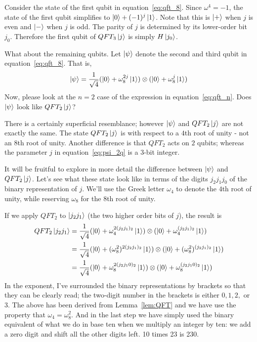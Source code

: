 Consider the state of the first qubit in equation~\eqref{eq:qft_8}. Since $\omega^4=-1$, the state of the first qubit simplifies to $\ket{0}+(-1)^j\ket{1}$. Note that this is $\ket{+}$ when $j$ is even and $\ket{-}$ when $j$ is odd. The parity of $j$ is determined by its lower-order bit $j_0$. Therefore the first qubit of $QFT_3\ket{j}$ is simply $H\ket{j_0}$.

What about the remaining qubits. Let $\ket{\psi}$ denote the second and third qubit in equation~\eqref{eq:qft_8}. That is,
\begin{equation}
\ket{\psi}=\frac{1}{\sqrt{4}}(\ket{0}+\omega_8^{2j}\ket{1})\otimes (\ket{0}+\omega_8^j\ket{1})
\label{eq:psi_2q}
\end{equation}
Now, please look at the $n=2$ case of the expression in equation~\eqref{eq:qft_n}. Does $\ket{\psi}$ look like $QFT_2\ket{j}$?

There is a certainly superficial resemblance; however $\ket{\psi}$ and $QFT_2\ket{j}$ are not exactly the same. The state $QFT_2\ket{j}$ is with respect to a $4$th root of unity - not an $8$th root of unity. Another difference is that $QFT_2$ acts on $2$ qubits; whereas the parameter $j$ in equation~\eqref{eq:psi_2q} is a $3$-bit integer.

It will be fruitful to explore in more detail the difference between $\ket{\psi}$ and $QFT_2\ket{j}$. Let's see what these state look like in terms of the digits $j_2j_1j_0$ of the binary representation of $j$. We'll use the Greek letter $\omega_4$ to denote the $4$th root of unity, while reserving $\omega_8$ for the $8$th root of unity.

If we apply $QFT_2$ to $\ket{j_2j_1}$ (the two higher order bits of $j$), the result is
\begin{align*}
    QFT_2\ket{j_2j_1} &=\frac{1}{\sqrt{4}}(\ket{0}+\omega_4^{2(j_2j_1)_2}\ket{1})\otimes(\ket{0}+\omega_4^{(j_2j_1)_2}\ket{1})\\
    &=\frac{1}{\sqrt{4}}(\ket{0}+(\omega_8^2)^{2(j_2j_1)_2}\ket{1})\otimes(\ket{0}+(\omega_8^2)^{(j_2j_1)_2}\ket{1})\\
    &=\frac{1}{\sqrt{4}}(\ket{0}+\omega_8^{2(j_2j_10)_2}\ket{1})\otimes (\ket{0}+\omega_8^{(j_2j_10)_2}\ket{1})
\end{align*}
In the exponent, I've surrounded the binary representations by brackets so that they can be clearly read; the two-digit number in the brackets is either $0,1,2,$ or $3$. The above has been derived from Lemma~\ref{lem:QFT} and we have use the property that $\omega_4=\omega_8^2$. And in the last step we have simply used the binary equivalent of what we do in base ten when we multiply an integer by ten: we add a zero digit and shift all the other digits left. 10 times 23 is 230.

